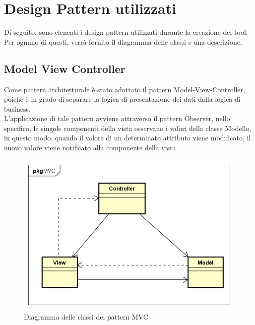 
\section{Design Pattern utilizzati}\label{sec:design-pattern-utilizzati}
Di seguito, sono elencati i design pattern utilizzati durante la creazione del tool. Per ognuno di questi, verrà fornito il diagramma delle classi e una descrizione.
\subsection{Model View Controller}\label{subsec:model-view-controller}
Come pattern architetturale è stato adottato il pattern Model-View-Controller, poiché è in grado di separare la logica di presentazione dei dati dalla logica di business.\\
L'applicazione di tale pattern avviene attraverso il pattern Observer, nello specifico, le singole componenti della vista osservano i valori della classe Modello, in questo modo, quando il valore di un determinato attributo viene modificato, il nuovo valore viene notificato alla componente della vista.
\begin{figure}[H]
    \centering
    \includegraphics[width=13cm, height=8cm]{./immagini/diagrammi_uml/mvc.png}
    \caption{Diagramma delle classi del pattern MVC}\label{fig:mvc}
\end{figure}

\newpage
